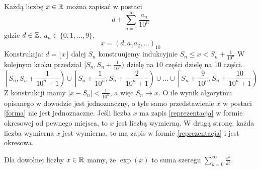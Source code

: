 \documentclass[9pt]{article}
\begin{document}
\begin{Przy}
    Każdą liczbę $x \in \mathbb{R}$ można zapisać w postaci
    \begin{equation}
        d + \sum_{n = 1}^{\infty} \frac{a_n}{10^n}
        \label{forma}
    \end{equation}
    gdzie $d \in \mathbb{Z}$, $a_n \in \{0,1,...,9\}$.
    \begin{equation}
        x = (d,a_1 a_2,...)_{10}
        \label{reprezentacja}
    \end{equation}
    Konstrukcja:
    $d = \lfloor x \rfloor$
    dalej $S_n$ konstruujemy indukcyjnie
    $S_n \le x < S_n + \frac{1}{10^n}$
    W kolejnym kroku przedział $[S_n, S_n+ \frac{1}{10^n})$ dzielę
    na $10$ części dzielę
    na $10$ części.
    \[
        \left[S_n, S_n + \frac{1}{10^n+1}\right) \cup
        \left[S_n + \frac{1}{10^n}, S_n + \frac{2}{10^n+1}\right) \cup
        ... \cup
        \left[S_n + \frac{9}{10^n}, S_n + \frac{10}{10^n+1}\right)
    \]
    Z konstrukcji mamy $\left|x - S_n\right| < \frac{1}{10^n}$, a więc
    $S_n \to x$.
    O ile wynik algorytmu opisanego w dowodzie jest jednoznaczny, o tyle samo przedstawienie $x$ w
    postaci \eqref{forma} nie jest jednoznaczne.
    Jeśli liczba $x$ ma zapis \eqref{reprezentacja} w formie okresowej od pewnego miejsca, to $x$ jest
    liczbą wymierną. W drugą stronę, każda liczba wymierna $x$ jest wymierna, to ma zapis w formie
    \eqref{reprezentacja} i jest okresowa.
\end{Przy}

\begin{Twi}
    Dla dowolnej liczby $x \in \mathbb{R}$ mamy, że $\exp(x)$ to suma szeregu
    $\sum_{k = 0}^{\infty} \frac{x^k}{k!}$.
\end{Twi}
\end{document}
